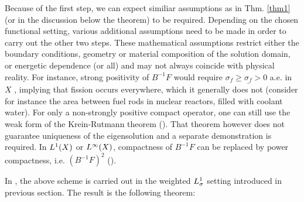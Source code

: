 Because of the first step, we can expect similiar assumptions as in Thm. \ref{thm1} (or in the discussion below the
theorem) to be required. Depending on the chosen functional setting, various additional assumptions need to be made in
order to carry out the other two steps.
These mathematical assumptions restrict either the boundary conditions, geometry or material composition of the solution
domain, or energetic dependence (or all) and may not always coincide with physical reality. For instance, strong
positivity of $B^{-1}F$ would require $\sigma_f \geq \underline{\sigma_f} > 0$ a.e. in $X$%
% 
, implying
that fission occurs everywhere, which it generally does not (consider for instance the area between fuel rods in nuclear
reactors, filled with coolant water). For only a non-strongly positive compact operator, one can still use the weak form
of the Krein-Rutmann theorem (\cite[Prop. 5.4.32]{DrabekNFA}). That theorem however does not guarantee uniqueness of the
eigensolution and a separate demonstration is required. In $\Lp[1](X)$ or $\Lp[\infty](X)$, compactness of $B^{-1}F$ can
be replaced by power compactness, i.e. $(B^{-1}F)^2$ (\cite{Sanchez3}).

In \cite{Sanchez3}, the above scheme is carried out in the weighted $\Lp[1]_{\sigma}$ setting introduced in previous
section. The result is the following theorem:

